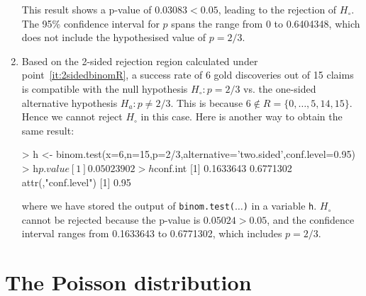 \begin{enumerate}
This result shows a p-value of $0.03083<0.05$, leading to the
rejection of $H_\circ$. The 95\% confidence interval for $p$ spans the
range from 0 to 0.6404348, which does not include the hypothesised
value of $p=2/3$.

\item Based on the 2-sided rejection region calculated under
  point~\ref{it:2sidedbinomR}, a success rate of 6 gold discoveries
  out of 15 claims is compatible with the null hypothesis $H_\circ:
  p=2/3$ vs.  the one-sided alternative hypothesis $H_a:
  p\neq{2/3}$. This is because $6 \notin
  R=\{0,\ldots,5,14,15\}$. Hence we cannot reject $H_\circ$ in this
  case.  Here is another way to obtain the same result:

\begin{console}
> h <- binom.test(x=6,n=15,p=2/3,alternative='two.sided',conf.level=0.95)
> h$p.value
[1] 0.05023902
> h$conf.int
[1] 0.1633643 0.6771302
attr(,"conf.level")
[1] 0.95
\end{console}

\noindent where we have stored the output of
\texttt{binom.test($\ldots$)} in a variable \texttt{h}. $H_\circ$
cannot be rejected because the p-value is $0.05024>0.05$, and the
confidence interval ranges from 0.1633643 to 0.6771302, which includes
$p=2/3$.

\end{enumerate}

\section{The Poisson distribution}
\label{sec:R-poisson}

